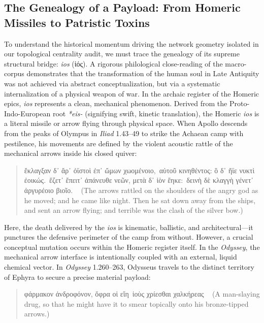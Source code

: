 \documentclass[11pt,twoside,a4paper]{article}
\begin{document}
\subsection{The Genealogy of a Payload: From Homeric Missiles to Patristic Toxins}
To understand the historical momentum driving the network geometry isolated in our topological centrality audit, we must trace the genealogy of its supreme structural bridge: \textit{ios} (\textgreek{ἰός}). A rigorous philological close-reading of the macro-corpus demonstrates that the transformation of the human soul in Late Antiquity was not achieved via abstract conceptualization, but via a systematic internalization of a physical weapon of war.
In the archaic register of the Homeric epics, \textit{ios} represents a clean, mechanical phenomenon. Derived from the Proto-Indo-European root \textit{*eis-} (signifying swift, kinetic translation), the Homeric \textit{ios} is a literal missile or arrow flying through physical space. When Apollo descends from the peaks of Olympus in \textit{Iliad} 1.43–49 to strike the Achaean camp with pestilence, his movements are defined by the violent acoustic rattle of the mechanical arrows inside his closed quiver:

\begin{quote}
\textgreek{ἔκλαγξαν δ᾽ ἄρ᾽ ὀϊστοὶ ἐπ᾽ ὤμων χωομένοιο,\
αὐτοῦ κινηθέντος: ὃ δ᾽ ἤϊε νυκτὶ ἐοικώς.\
ἕζετ᾽ ἔπειτ᾽ ἀπάνευθε νεῶν, μετὰ δ᾽ ἰὸν ἕηκε:\
δεινὴ δὲ κλαγγὴ γένετ᾽ ἀργυρέοιο βιοῖο.} \
\medskip
\small (The arrows rattled on the shoulders of the angry god as he moved; and he came like night. Then he sat down away from the ships, and sent an arrow flying; and terrible was the clash of the silver bow.)
\end{quote}

Here, the death delivered by the \textit{ios} is kinematic, ballistic, and architectural—it punctures the defensive perimeter of the camp from without. However, a crucial conceptual mutation occurs within the Homeric register itself. In the \textit{Odyssey}, the mechanical arrow interface is intentionally coupled with an external, liquid chemical vector. In \textit{Odyssey} 1.260–263, Odysseus travels to the distinct territory of Ephyra to secure a precise material payload:
\begin{quote}
\textgreek{φάρμακον ἀνδροφόνον, ὄφρα οἱ εἴη\
ἰοὺς χρίεσθαι χαλκήρεας} \
\medskip
\small (A man-slaying drug, so that he might have it to smear topically onto his bronze-tipped arrows.)
\end{quote}
\end{document}
